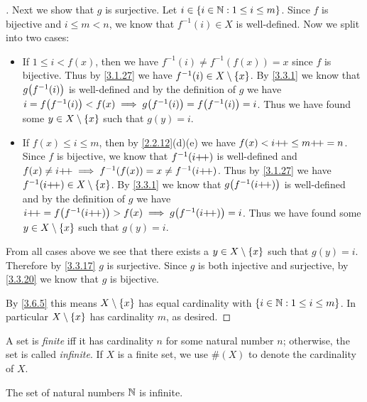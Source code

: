 \begin{proof}[]
	Next we show that \(g\) is surjective.
	Let \(i \in \left\lbrace i \in \mathbb{N} : 1 \leq i \leq m\right\rbrace\).
	Since \(f\) is bijective and \(i \leq m < n\), we know that \(f^{-1}(i) \in X\) is well-defined.
	Now we split into two cases:
	\begin{itemize}
		\item If \(1 \leq i < f(x)\), then we have \(f^{-1}(i) \neq f^{-1}(f(x)) = x\) since \(f\) is bijective.
		      Thus by \cref{3.1.27} we have \(f^{-1}(i) \in X \setminus \left\lbrace x\right\rbrace\).
		      By \cref{3.3.1} we know that \(g\pa{f^{-1}(i)}\) is well-defined and by the definition of \(g\) we have \(i = f\pa{f^{-1}(i)} < f(x) \implies g\pa{f^{-1}(i)} = f\pa{f^{-1}(i)} = i\).
		      Thus we have found some \(y \in X \setminus \left\lbrace x\right\rbrace\) such that \(g(y) = i\).
		\item If \(f(x) \leq i \leq m\), then by \cref{2.2.12}(d)(e) we have \(f(x) < i{+}\!{+} \leq m{+}\!{+} = n\).
		      Since \(f\) is bijective, we know that \(f^{-1}(i{+}\!{+})\) is well-defined and \(f(x) \neq i{+}\!{+} \implies f^{-1}(f(x)) = x \neq f^{-1}(i{+}\!{+})\).
		      Thus by \cref{3.1.27} we have \(f^{-1}(i{+}\!{+}) \in X \setminus \left\lbrace x\right\rbrace\).
		      By \cref{3.3.1} we know that \(g\pa{f^{-1}(i\pp)}\) is well-defined and by the definition of \(g\) we have \(i\pp = f\pa{f^{-1}(i\pp)} > f(x) \implies g\pa{f^{-1}(i\pp)} = i\).
		      Thus we have found some \(y \in X \setminus \left\lbrace x\right\rbrace\) such that \(g(y) = i\).
	\end{itemize}
	From all cases above we see that there exists a \(y \in X \setminus \left\lbrace x\right\rbrace\) such that \(g(y) = i\).
	Therefore by \cref{3.3.17} \(g\) is surjective.
	Since \(g\) is both injective and surjective, by \cref{3.3.20} we know that \(g\) is bijective.

	By \cref{3.6.5} this means \(X \setminus \left\lbrace x\right\rbrace\) has equal cardinality with \(\left\lbrace i \in \mathbb{N} : 1 \leq i \leq m\right\rbrace\).
	In particular \(X \setminus \left\lbrace x\right\rbrace\) has cardinality \(m\), as desired.
\end{proof}

\begin{defn}\label{3.6.10}
	A set is \emph{finite} iff it has cardinality \(n\) for some natural number \(n\);
	otherwise, the set is called \emph{infinite}.
	If \(X\) is a finite set, we use \(\#(X)\) to denote the cardinality of \(X\).
\end{defn}

\setcounter{thm}{11}
\begin{thm}\label{3.6.12}
	The set of natural numbers \(\mathbb{N}\) is infinite.
\end{thm}

